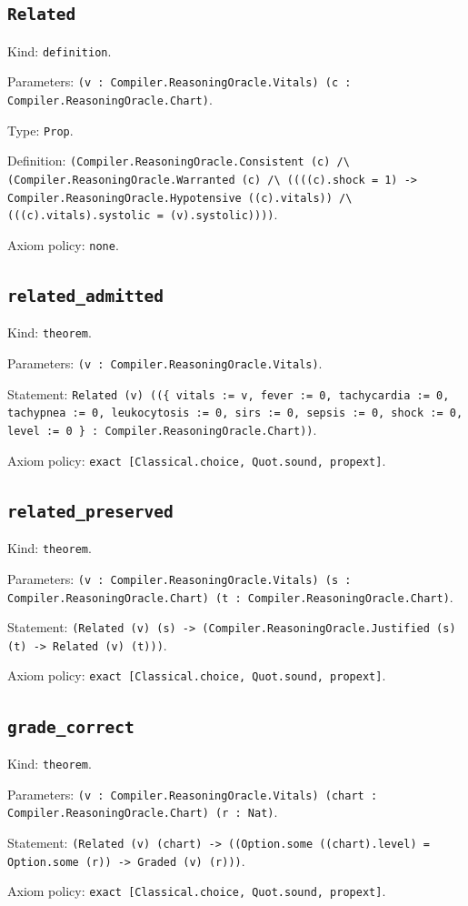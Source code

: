 \documentclass[11pt]{article}
\begin{document}
\subsection*{\texttt{Related}}
\noindent Kind: \texttt{definition}.\par
\noindent Parameters: \texttt{(v : Compiler.ReasoningOracle.Vitals) (c : Compiler.ReasoningOracle.Chart)}.\par
\noindent Type: \texttt{Prop}.\par
\noindent Definition: \texttt{(Compiler.ReasoningOracle.Consistent (c) /\textbackslash{} (Compiler.ReasoningOracle.Warranted (c) /\textbackslash{} ((((c).shock = 1) -> Compiler.ReasoningOracle.Hypotensive ((c).vitals)) /\textbackslash{} (((c).vitals).systolic = (v).systolic))))}.\par
\noindent Axiom policy: \texttt{none}.\par
\subsection*{\texttt{related\_admitted}}
\noindent Kind: \texttt{theorem}.\par
\noindent Parameters: \texttt{(v : Compiler.ReasoningOracle.Vitals)}.\par
\noindent Statement: \texttt{Related (v) ((\{ vitals := v, fever := 0, tachycardia := 0, tachypnea := 0, leukocytosis := 0, sirs := 0, sepsis := 0, shock := 0, level := 0 \} : Compiler.ReasoningOracle.Chart))}.\par
\noindent Axiom policy: \texttt{exact [Classical.choice, Quot.sound, propext]}.\par
\subsection*{\texttt{related\_preserved}}
\noindent Kind: \texttt{theorem}.\par
\noindent Parameters: \texttt{(v : Compiler.ReasoningOracle.Vitals) (s : Compiler.ReasoningOracle.Chart) (t : Compiler.ReasoningOracle.Chart)}.\par
\noindent Statement: \texttt{(Related (v) (s) -> (Compiler.ReasoningOracle.Justified (s) (t) -> Related (v) (t)))}.\par
\noindent Axiom policy: \texttt{exact [Classical.choice, Quot.sound, propext]}.\par
\subsection*{\texttt{grade\_correct}}
\noindent Kind: \texttt{theorem}.\par
\noindent Parameters: \texttt{(v : Compiler.ReasoningOracle.Vitals) (chart : Compiler.ReasoningOracle.Chart) (r : Nat)}.\par
\noindent Statement: \texttt{(Related (v) (chart) -> ((Option.some ((chart).level) = Option.some (r)) -> Graded (v) (r)))}.\par
\noindent Axiom policy: \texttt{exact [Classical.choice, Quot.sound, propext]}.\par
\end{document}
